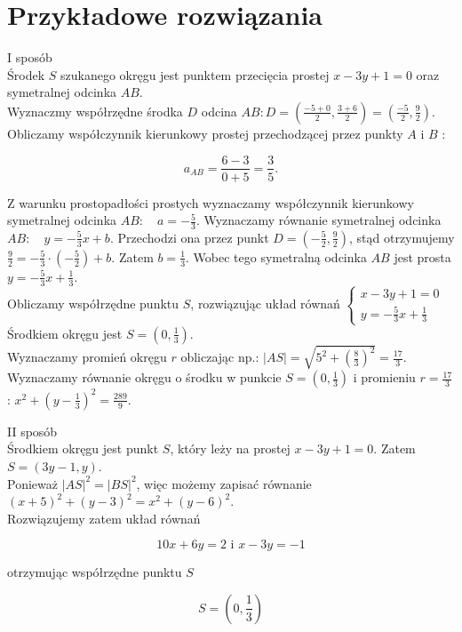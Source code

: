 \documentclass[10pt]{article}
\begin{document}
\section*{Przykładowe rozwiązania}
I sposób\\
Środek $S$ szukanego okręgu jest punktem przecięcia prostej $x-3 y+1=0$ oraz symetralnej odcinka $A B$.\\
Wyznaczmy współrzędne środka $D$ odcina $A B: D=\left(\frac{-5+0}{2}, \frac{3+6}{2}\right)=\left(\frac{-5}{2}, \frac{9}{2}\right)$.\\
Obliczamy współczynnik kierunkowy prostej przechodzącej przez punkty $A$ i $B$ :

$$
a_{A B}=\frac{6-3}{0+5}=\frac{3}{5} .
$$

Z warunku prostopadłości prostych wyznaczamy współczynnik kierunkowy symetralnej odcinka $A B: \quad a=-\frac{5}{3}$. Wyznaczamy równanie symetralnej odcinka $A B: \quad y=-\frac{5}{3} x+b$. Przechodzi ona przez punkt $D=\left(-\frac{5}{2}, \frac{9}{2}\right)$, stąd otrzymujemy $\frac{9}{2}=-\frac{5}{3} \cdot\left(-\frac{5}{2}\right)+b$. Zatem $b=\frac{1}{3}$. Wobec tego symetralną odcinka $A B$ jest prosta $y=-\frac{5}{3} x+\frac{1}{3}$.\\
Obliczamy współrzędne punktu $S$, rozwiązując układ równań $\left\{\begin{array}{l}x-3 y+1=0 \\ y=-\frac{5}{3} x+\frac{1}{3}\end{array}\right.$ Środkiem okręgu jest $S=\left(0, \frac{1}{3}\right)$.\\
Wyznaczamy promień okręgu $r$ obliczając np.: $|A S|=\sqrt{5^{2}+\left(\frac{8}{3}\right)^{2}}=\frac{17}{3}$.\\
Wyznaczamy równanie okręgu o środku w punkcie $S=\left(0, \frac{1}{3}\right)$ i promieniu $r=\frac{17}{3}$ : $x^{2}+\left(y-\frac{1}{3}\right)^{2}=\frac{289}{9}$.

II sposób\\
Środkiem okręgu jest punkt $S$, który leży na prostej $x-3 y+1=0$. Zatem $S=(3 y-1, y)$.\\
Ponieważ $|A S|^{2}=|B S|^{2}$, więc możemy zapisać równanie $(x+5)^{2}+(y-3)^{2}=x^{2}+(y-6)^{2}$.\\
Rozwiązujemy zatem układ równań

$$
10 x+6 y=2 \text { i } x-3 y=-1
$$

otrzymując współrzędne punktu $S$

$$
S=\left(0, \frac{1}{3}\right)
$$
\end{document}
